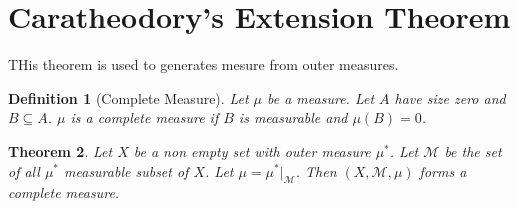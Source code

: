 \documentclass[oneside]{article}
\newtheorem{theorem}{Theorem}
\newtheorem{definition}[theorem]{Definition}
\begin{document}
\section{Caratheodory's Extension Theorem}
THis theorem is used to generates mesure from outer measures. 
\begin{definition}[Complete Measure]
    Let $\mu$ be a measure. Let $A$ have size zero and $B\subseteq A$. $\mu$ is a complete measure if $B$ is measurable and $\mu(B)=0$.
\end{definition}

\begin{theorem}
    Let $X$ be a non empty set with outer measure $\mu^*$. Let $\mathcal{M}$ be the set of all $\mu^*$ measurable subset of $X$. Let $\mu=\mu^*|_\mathcal{M}$. Then $(X,\mathcal{M},\mu)$ forms a complete measure.
\end{theorem}
\end{document}
